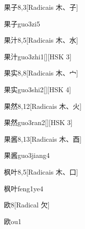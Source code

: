 \begin{entry}{果子}{8,3}[Radicais ⽊、⼦]
  \begin{phonetics}{果子}{guo3zi5}
  \end{phonetics}
\end{entry}

\begin{entry}{果汁}{8,5}[Radicais ⽊、⽔]
  \begin{phonetics}{果汁}{guo3zhi1}[][HSK 3]
  \end{phonetics}
\end{entry}

\begin{entry}{果实}{8,8}[Radicais ⽊、⼧]
  \begin{phonetics}{果实}{guo3shi2}[][HSK 4]
  \end{phonetics}
\end{entry}

\begin{entry}{果然}{8,12}[Radicais ⽊、⽕]
  \begin{phonetics}{果然}{guo3ran2}[][HSK 3]
  \end{phonetics}
\end{entry}

\begin{entry}{果酱}{8,13}[Radicais ⽊、⾣]
  \begin{phonetics}{果酱}{guo3jiang4}
  \end{phonetics}
\end{entry}

\begin{entry}{枫叶}{8,5}[Radicais ⽊、⼝]
  \begin{phonetics}{枫叶}{feng1ye4}
  \end{phonetics}
\end{entry}

\begin{entry}{欧}{8}[Radical ⽋]
  \begin{phonetics}{欧}{ou1}
  \end{phonetics}
\end{entry}


